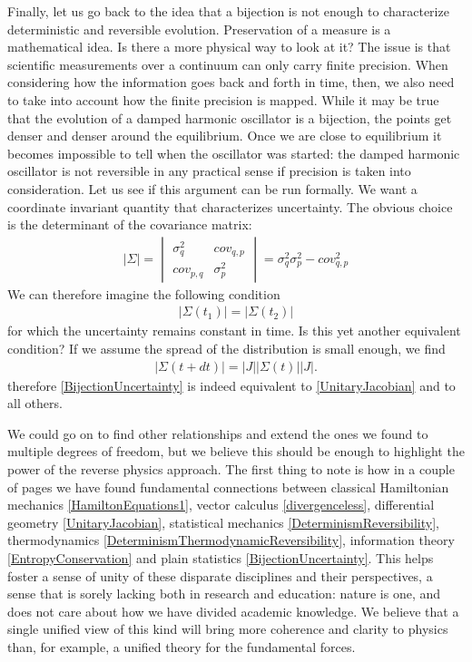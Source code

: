 \documentclass[10pt,twocolumn, nofootinbib]{revtex4-2}
\begin{document}
Finally, let us go back to the idea that a bijection is not enough to characterize deterministic and reversible evolution. Preservation of a measure is a mathematical idea. Is there a more physical way to look at it? The issue is that scientific measurements over a continuum can only carry finite precision. When considering how the information goes back and forth in time, then, we also need to take into account how the finite precision is mapped. While it may be true that the evolution of a damped harmonic oscillator is a bijection, the points get denser and denser around the equilibrium. Once we are close to equilibrium it becomes impossible to tell when the oscillator was started: the damped harmonic oscillator is not reversible in any practical sense if precision is taken into consideration. Let us see if this argument can be run formally. We want a coordinate invariant quantity that characterizes uncertainty. The obvious choice is the determinant of the covariance matrix:
\begin{align}\label{CovarianceMatrix}
	|\Sigma| = \begin{vmatrix}
		\sigma_q^2 & cov_{q,p} \\
		cov_{p,q} & \sigma_p^2
	\end{vmatrix} = \sigma_q^2 \sigma_p^2 - cov_{q,p}^2
\end{align}
We can therefore imagine the following condition
\begin{align}\label{BijectionUncertainty}
	|\Sigma(t_1)| = |\Sigma(t_2)| 
\end{align}
for which the uncertainty remains constant in time. Is this yet another equivalent condition? If we assume the spread of the distribution is small enough, we find
\begin{align}
	|\Sigma(t + dt)| = |J| |\Sigma(t)| |J|.
\end{align}
therefore \eqref{BijectionUncertainty} is indeed equivalent to \eqref{UnitaryJacobian} and to all others.

We could go on to find other relationships and extend the ones we found to multiple degrees of freedom, but we believe this should be enough to highlight the power of the reverse physics approach. The first thing to note is how in a couple of pages we have found fundamental connections between classical Hamiltonian mechanics \eqref{HamiltonEquations1}, vector calculus \eqref{divergenceless}, differential geometry \eqref{UnitaryJacobian}, statistical mechanics \eqref{DeterminismReversibility}, thermodynamics \eqref{DeterminismThermodynamicReversibility}, information theory \eqref{EntropyConservation} and plain statistics \eqref{BijectionUncertainty}. This helps foster a sense of unity of these disparate disciplines and their perspectives, a sense that is sorely lacking both in research and education: nature is one, and does not care about how we have divided academic knowledge. We believe that a single unified view of this kind will bring more coherence and clarity to physics than, for example, a unified theory for the fundamental forces.
\end{document}

